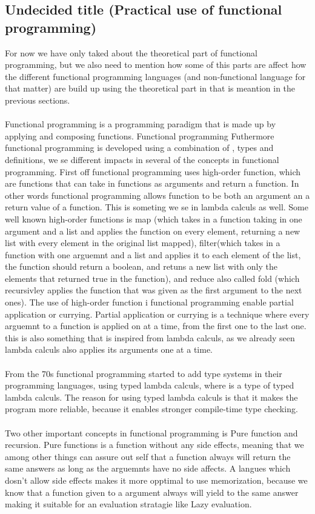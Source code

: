 \subsection{Undecided title (Practical use of functional programming)}
For now we have only taked about the theoretical part of functional programming, but we also need to mention how some of this parts 
are affect how the different functional programming languages (and non-functional language for that matter) are build up using the theoretical
part in that is meantion in the previous sections.
\\ \\
Functional programming is a programming paradigm that is made up by applying and composing functions. Functional programming
Futhermore functional programming is developed using a combination of , types and definitions, we se  different impacts in several
of the concepts in functional programming. 
First off functional programming uses high-order function, which are functions that can take in functions as arguments
and return a function. In other words functional programming allows function to be both an argument an a return value of a function. This is someting 
we se in lambda calculs as well. Some well known high-order functions is map (which takes in a function taking in one argument and a list and applies the function on every element, returning 
a new list with every element in the original list mapped), 
filter(which takes in a function with one arguemnt and a list and applies it to each element of the list, the function should return a boolean, and retuns a new list with only the elements
that returned true in the function), and reduce also called fold (which recursivley applies the function that was given as the first argument to the next ones). 
The use of high-order function i functional programming enable partial application or currying. Partial application or currying is a technique
where every arguemnt to a function is applied on at a time, from the first one to the last one. this is also something that is inspired from
lambda calculs, as we already seen lambda calculs also applies its arguments one at a time.
\\ \\
From the 70s functional programming started to add type systems in their programming languages,
using typed lambda calculs, where  is a type of typed lambda calculs. 
The reason for using typed lambda calculs is that it makes the program more reliable, because it enables stronger compile-time 
type checking.  
\\ \\
Two other important concepts in functional programming is Pure function and recursion. Pure functions is a function without any side effects, meaning 
that we among other things can assure out self that a function always will return the same answers as long as the arguemnts have no side affects. A langues which dosn't allow 
side effects makes it more opptimal to use memorization, because we know that a function given to a argument always will yield to the same answer 
making it suitable for an evaluation stratagie like Lazy evaluation.